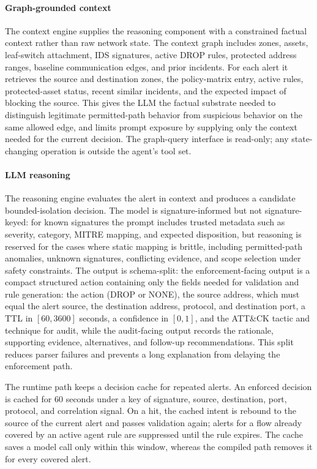 \documentclass[final,5p]{elsarticle}
\begin{document}
\paragraph{Graph-grounded context}
The context engine supplies the reasoning component with a constrained factual context rather than raw network state. The context graph includes zones, assets, leaf-switch attachment, IDS signatures, active DROP rules, protected address ranges, baseline communication edges, and prior incidents. For each alert it retrieves the source and destination zones, the policy-matrix entry, active rules, protected-asset status, recent similar incidents, and the expected impact of blocking the source. This gives the LLM the factual substrate needed to distinguish legitimate permitted-path behavior from suspicious behavior on the same allowed edge, and limits prompt exposure by supplying only the context needed for the current decision. The graph-query interface is read-only; any state-changing operation is outside the agent's tool set.

\paragraph{LLM reasoning}
The reasoning engine evaluates the alert in context and produces a candidate bounded-isolation decision. The model is signature-informed but not signature-keyed: for known signatures the prompt includes trusted metadata such as severity, category, MITRE mapping, and expected disposition, but reasoning is reserved for the cases where static mapping is brittle, including permitted-path anomalies, unknown signatures, conflicting evidence, and scope selection under safety constraints. The output is schema-split: the enforcement-facing output is a compact structured action containing only the fields needed for validation and rule generation: the action (DROP or NONE), the source address, which must equal the alert source, the destination address, protocol, and destination port, a TTL in $[60,3600]$ seconds, a confidence in $[0,1]$, and the ATT\&CK tactic and technique for audit, while the audit-facing output records the rationale, supporting evidence, alternatives, and follow-up recommendations. This split reduces parser failures and prevents a long explanation from delaying the enforcement path.

The runtime path keeps a decision cache for repeated alerts. An enforced decision is cached for 60 seconds under a key of signature, source, destination, port, protocol, and correlation signal. On a hit, the cached intent is rebound to the source of the current alert and passes validation again; alerts for a flow already covered by an active agent rule are suppressed until the rule expires. The cache saves a model call only within this window, whereas the compiled path removes it for every covered alert.
\end{document}
